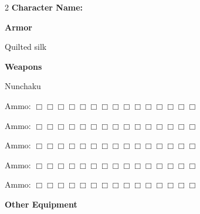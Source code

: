 \documentclass[10pt]{article}
\begin{document}
\begin{multicols}{2}
\textbf{Character Name:} \hrulefill

\vspace{24pt}

\textbf{Armor}


Quilted silk




\hrulefill


\hrulefill


\hrulefill



\vspace{24pt}

\textbf{Weapons}


Nunchaku




\hrulefill

Ammo: $\Box \Box \Box \Box \Box \Box \Box \Box \Box \Box \Box \Box \Box \Box \Box$ 


\hrulefill

Ammo: $\Box \Box \Box \Box \Box \Box \Box \Box \Box \Box \Box \Box \Box \Box \Box$ 


\hrulefill

Ammo: $\Box \Box \Box \Box \Box \Box \Box \Box \Box \Box \Box \Box \Box \Box \Box$ 


\hrulefill

Ammo: $\Box \Box \Box \Box \Box \Box \Box \Box \Box \Box \Box \Box \Box \Box \Box$ 


\hrulefill

Ammo: $\Box \Box \Box \Box \Box \Box \Box \Box \Box \Box \Box \Box \Box \Box \Box$ 



\vspace{24pt}

\textbf{Other Equipment}




\hrulefill


\hrulefill


\hrulefill


\hrulefill


\hrulefill


\hrulefill


\hrulefill


\hrulefill


\hrulefill


\hrulefill


\hrulefill


\hrulefill



\end{multicols}
\end{document}
